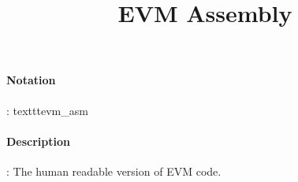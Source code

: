 \documentclass[10pt,a4paper,oneside]{scrartcl}
\author{}
\title{EVM Assembly}
\date{}
\begin{document}
\maketitle
\paragraph{Notation}: texttt{evm\_asm}
\paragraph{Description}: The human readable version of EVM code. 
\end{document}
